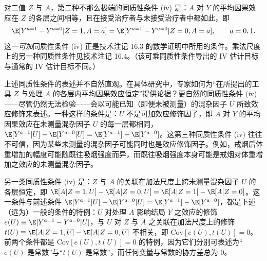 对二值 $Z$ 与 $A$，第二种不那么极端的同质性条件 (iv) 是：$A$ 对 $Y$ 的平均因果效应在 $Z$ 的各层之间相等，且在接受治疗者与未接受治疗者中都如此，即
\[
\E[Y^{a=1}-Y^{a=0}|Z=1,A=a]=\E[Y^{a=1}-Y^{a=0}|Z=0,A=a],\qquad a=0,1.
\]
这一\emph{可加}同质性条件 (iv) 正是技术注记 16.3 的数学证明中所用的条件。乘法尺度上的另一种同质性条件见技术注记 16.4。（该可乘同质性条件导出的 IV 估计目标与通常的 IV 估计目标不同。）

上述同质性条件的表述并不自然直观。在具体研究中，专家如何为“在所提出的工具 $Z$ 与处理 $A$ 的各层内平均因果效应恒定”提供论据？更自然的同质性条件 (iv)——尽管仍然无法检验——会以可能已知（即便未被测量）的混杂因子 $U$ 所致效应修饰来表述。一种这样的条件是：$U$ 不是可加效应修饰因子，即 $A$ 对 $Y$ 的平均因果效应在未测量混杂因子 $U$ 的每一层都相同，$\E[Y^{a=1}|U]-\E[Y^{a=0}|U]=\E[Y^{a=1}]-\E[Y^{a=0}]$。这第三种同质性条件 (iv) 往往不可信，因为某些未测量的混杂因子可能同时也是效应修饰因子。例如，戒烟后体重增加的幅度可能随既往吸烟强度而异，而既往吸烟强度本身可能是戒烟对体重增加之效应的未测量混杂因子。

另一类同质性条件 (iv) 是：$Z$ 与 $A$ 的关联在加法尺度上跨未测量混杂因子 $U$ 的各层恒定，即 $\E[A|Z=1,U]-\E[A|Z=0,U]=\E[A|Z=1]-\E[A|Z=0]$。这一条件与前述条件 $\E[Y^{a=1}|U]-\E[Y^{a=0}|U]=\E[Y^{a=1}]-\E[Y^{a=0}]$，都是下述（远为）一般的条件的特例：$U$ 对处理 $A$ 影响结局 $Y$ 之效应的修饰 $e(U)\equiv\E[Y^{a=1}-Y^{a=0}|U]$，与 $U$ 对 $Z$ 与 $A$ 之关联在加法尺度上的修饰 $t(U)\equiv\E[A|Z=1,U]-\E[A|Z=0,U]$ 不相关，即 $\mathrm{Cov}[e(U),t(U)]=0$。前两个条件都是 $\mathrm{Cov}[e(U),t(U)]=0$ 的特例，因为它们分别可表述为“$e(U)$ 是常数”与“$t(U)$ 是常数”，而任何变量与常数的协方差总为 0。

